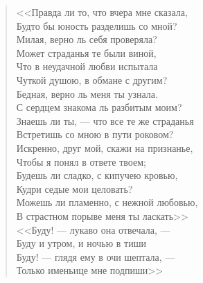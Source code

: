 \begin{verse}
\begin{altverse}
<<Правда ли то, что вчера мне сказала,\\
    Будто бы юность разделишь со мной?\\
Милая, верно ль себя проверяла?\\
    Может страданья те были виной,\\
Что в неудачной любви испытала\\
    Чуткой душою, в обмане с другим?\\
Бедная, верно ль меня ты узнала.\\
    С сердцем знакома ль разбитым моим?\\
Знаешь ли ты, --- что все те же страданья\\
    Встретишь со мною в пути роковом?\\
Искренно, друг мой, скажи на признанье,\\
    Чтобы я понял в ответе твоем;\\
Будешь ли сладко, с кипучею кровью,\\
    Кудри седые мои целовать?\\
Можешь ли пламенно, с нежной любовью,\\
    В страстном порыве меня ты ласкать\ldotsq>>\\
<<Буду! --- лукаво она отвечала, ---\\
Буду и утром, и ночью в тиши\ldotst\\
Буду! --- глядя ему в очи шептала, ---\\
Только именьице мне подпиши\ldotst>>
\end{altverse}
\end{verse}

